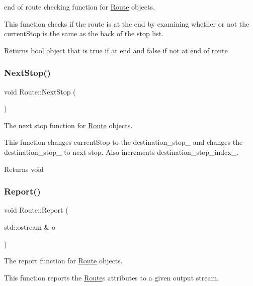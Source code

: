 end of route checking function for \hyperlink{classRoute}{Route} objects. 

This function checks if the route is at the end by examining whether or not the current\+Stop is the same as the back of the stop list.

\begin{DoxyReturn}{Returns}
bool object that is true if at end and false if not at end of route 
\end{DoxyReturn}
\mbox{\label{classRoute_aefdcf5a8db15f50d840585914744af6f}} 
\subsubsection{\texorpdfstring{Next\+Stop()}{NextStop()}}
{\footnotesize\ttfamily void Route\+::\+Next\+Stop (\begin{DoxyParamCaption}{ }\end{DoxyParamCaption})}



The next stop function for \hyperlink{classRoute}{Route} objects. 

This function changes current\+Stop to the destination\+\_\+stop\+\_\+ and changes the destination\+\_\+stop\+\_\+ to next stop. Also increments destination\+\_\+stop\+\_\+index\+\_\+.

\begin{DoxyReturn}{Returns}
void 
\end{DoxyReturn}
\mbox{\label{classRoute_a6115a741ea15af716c1a624627ec954a}} 
\subsubsection{\texorpdfstring{Report()}{Report()}}
{\footnotesize\ttfamily void Route\+::\+Report (\begin{DoxyParamCaption}\item[{std\+::ostream \&}]{o }\end{DoxyParamCaption})}



The report function for \hyperlink{classRoute}{Route} objects. 

This function reports the \hyperlink{classRoute}{Route}\textquotesingle{}s attributes to a given output stream.


